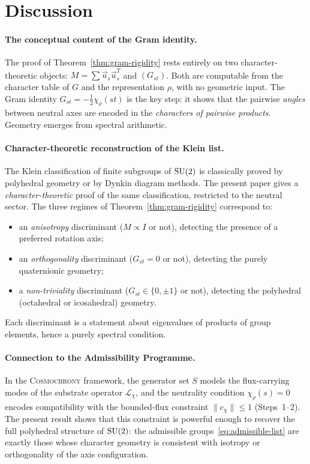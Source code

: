 \section{Discussion}
  \label{sec:discussion}

  \paragraph{The conceptual content of the Gram identity.}
    The proof of Theorem~\ref{thm:gram-rigidity} rests entirely on two character-theoretic
    objects: $M = \sum \vec{u}_s\vec{u}_s^T$ and $(G_{st})$.
    Both are computable from the character table of $G$ and the representation $\rho$,
    with no geometric input.
    The Gram identity $G_{st} = -\tfrac{1}{2}\chi_\rho(st)$ is the key step:
    it shows that the pairwise \emph{angles} between neutral axes are encoded in the
    \emph{characters of pairwise products}.
    Geometry emerges from spectral arithmetic.

  \paragraph{Character-theoretic reconstruction of the Klein list.}
    The Klein classification of finite subgroups of $\mathrm{SU}(2)$ is classically proved
    by polyhedral geometry or by Dynkin diagram methods.
    The present paper gives a \emph{character-theoretic} proof of the same classification,
    restricted to the neutral sector.
    The three regimes of Theorem~\ref{thm:gram-rigidity} correspond to:
    \begin{itemize}
      \item an \emph{anisotropy} discriminant ($M \propto I$ or not), detecting the
      presence of a preferred rotation axis;
      \item an \emph{orthogonality} discriminant ($G_{st} = 0$ or not), detecting
      the purely quaternionic geometry;
      \item a \emph{non-triviality} discriminant ($G_{st} \in \{0,\pm 1\}$ or not),
      detecting the polyhedral (octahedral or icosahedral) geometry.
    \end{itemize}
    Each discriminant is a statement about eigenvalues of products of group elements,
    hence a purely spectral condition.

  \paragraph{Connection to the Admissibility Programme.}
    In the \textsc{Cosmochrony} framework, the generator set $S$ models the flux-carrying
    modes of the substrate operator $\mathcal{L}_\chi$, and the neutrality condition
    $\chi_\rho(s) = 0$ encodes compatibility with the bounded-flux constraint $\|c_\chi\| \le 1$
    (Steps~1--2).
    The present result shows that this constraint is powerful enough to recover the
    full polyhedral structure of $\mathrm{SU}(2)$: the admissible groups~\eqref{eq:admissible-list}
    are exactly those whose character geometry is consistent with isotropy or
    orthogonality of the axis configuration.

